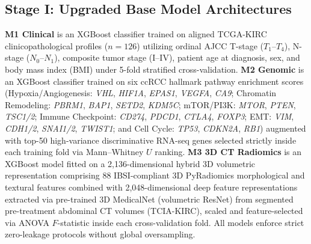 \subsection{Stage I: Upgraded Base Model Architectures}
\textbf{M1 Clinical} is an XGBoost classifier trained on aligned TCGA-KIRC clinicopathological profiles ($n = 126$) utilizing ordinal AJCC T-stage ($T_1$--$T_4$), N-stage ($N_0$--$N_1$), composite tumor stage (I--IV), patient age at diagnosis, sex, and body mass index (BMI) under 5-fold stratified cross-validation. \textbf{M2 Genomic} is an XGBoost classifier trained on six ccRCC hallmark pathway enrichment scores (Hypoxia/Angiogenesis: \textit{VHL}, \textit{HIF1A}, \textit{EPAS1}, \textit{VEGFA}, \textit{CA9}; Chromatin Remodeling: \textit{PBRM1}, \textit{BAP1}, \textit{SETD2}, \textit{KDM5C}; mTOR/PI3K: \textit{MTOR}, \textit{PTEN}, \textit{TSC1/2}; Immune Checkpoint: \textit{CD274}, \textit{PDCD1}, \textit{CTLA4}, \textit{FOXP3}; EMT: \textit{VIM}, \textit{CDH1/2}, \textit{SNAI1/2}, \textit{TWIST1}; and Cell Cycle: \textit{TP53}, \textit{CDKN2A}, \textit{RB1}) augmented with top-50 high-variance discriminative RNA-seq genes selected strictly inside each training fold via Mann--Whitney $U$ ranking. \textbf{M3 3D CT Radiomics} is an XGBoost model fitted on a 2,136-dimensional hybrid 3D volumetric representation comprising 88 IBSI-compliant 3D PyRadiomics morphological and textural features combined with 2,048-dimensional deep feature representations extracted via pre-trained 3D MedicalNet (volumetric ResNet) from segmented pre-treatment abdominal CT volumes (TCIA-KIRC), scaled and feature-selected via ANOVA $F$-statistic inside each cross-validation fold. All models enforce strict zero-leakage protocols without global oversampling.

